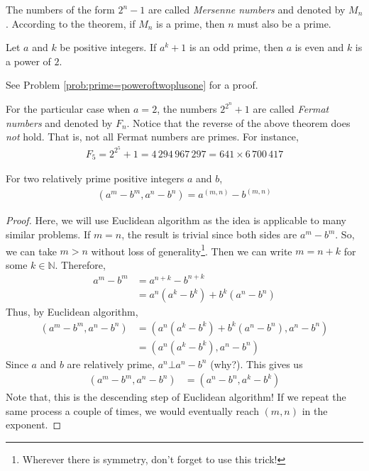 \begin{remark}
	The numbers of the form $2^n-1$ are called \textit{Mersenne numbers} and denoted by $M_n$. According to the theorem, if $M_n$ is a prime, then $n$ must also be a prime.
\end{remark}

\begin{theorem}\label{thm:primec}
	Let $a$ and $k$ be positive integers. If $a^k+1$ is an odd prime, then $a$ is even and $k$ is a power of $2$.
\end{theorem}

See Problem \ref{prob:prime=poweroftwoplusone} for a proof.

\begin{remark}
	For the particular case when $a=2$, the numbers $2^{2^n}+1$ are called \textit{Fermat numbers} and denoted by $F_n$. Notice that the reverse of the above theorem does \textit{not} hold. That is, not all Fermat numbers are primes. For instance,
	\begin{align*}
		F_5 = 2^{2^5}+1 = 4\, 294\, 967\, 297 = 641 \times 6\, 700\, 417
	\end{align*}
\end{remark}

\begin{theorem}
	For two relatively prime positive integers $a$ and $b$,
	\begin{align*}
		(a^m-b^m,a^n-b^n)=a^{(m,n)}-b^{(m,n)}
	\end{align*}
\end{theorem}

\begin{proof}
	Here, we will use Euclidean algorithm as the idea is applicable to many similar problems. If $m=n$, the result is trivial since both sides are $a^m-b^m$. So, we can take $m>n$ without loss of generality\footnote{Wherever there is symmetry, don't forget to use this trick!}. Then we can write $m=n+k$ for some $k\in\mathbb{N}$. Therefore,
	\begin{align*}
		a^m-b^m
			& = a^{n+k}-b^{n+k}\\
			& = a^n(a^k-b^k)+b^k(a^n-b^n)
	\end{align*}
	Thus, by Euclidean algorithm,
	\begin{align*}
		(a^m-b^m,a^n-b^n) & = (a^n(a^k-b^k)+b^k(a^n-b^n),a^n-b^n)\\
		&=(a^n(a^k-b^k),a^n-b^n)
	\end{align*}
	Since $a$ and $b$ are relatively prime, $a^n\bot a^n-b^n$ (why?). This gives us
	\begin{align*}
		(a^m-b^m,a^n-b^n) & = (a^n-b^n,a^k-b^k)
	\end{align*}
	Note that, this is the descending step of Euclidean algorithm! If we repeat the same process a couple of times, we would eventually reach $(m,n)$ in the exponent.
\end{proof}

